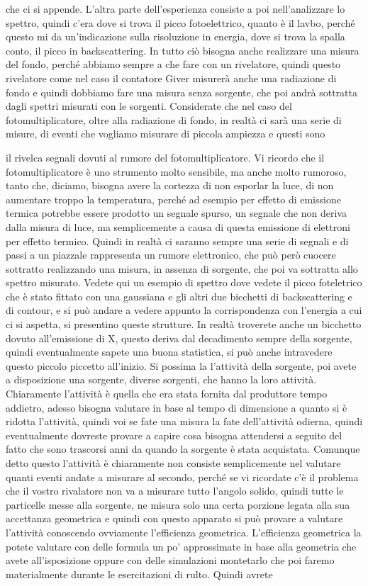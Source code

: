 che ci si appende. L'altra parte dell'esperienza consiste a poi nell'analizzare lo spettro, quindi c'era dove si trova il picco fotoelettrico, quanto è il lavbo, perché questo mi da un'indicazione sulla risoluzione in energia, dove si trova la spalla conto, il picco in backscattering. In tutto ciò bisogna anche realizzare una misura del fondo, perché abbiamo sempre a che fare con un rivelatore, quindi questo rivelatore come nel caso il contatore Giver misurerà anche una radiazione di fondo e quindi dobbiamo fare una misura senza sorgente, che poi andrà sottratta dagli spettri misurati con le sorgenti. Considerate che nel caso del fotomultiplicatore, oltre alla radiazione di fondo, in realtà ci sarà una serie di misure, di eventi che vogliamo misurare di piccola ampiezza e questi sono 

il rivelca segnali dovuti al rumore del fotomultiplicatore. Vi ricordo che il fotomultiplicatore è uno strumento molto sensibile, ma anche molto rumoroso, tanto che, diciamo, bisogna avere la cortezza di non esporlar la luce, di non aumentare troppo la temperatura, perché ad esempio per effetto di emissione termica potrebbe essere prodotto un segnale spurso, un segnale che non deriva dalla misura di luce, ma semplicemente a causa di questa emissione di elettroni per effetto termico. Quindi in realtà ci saranno sempre una serie di segnali e di passi a un piazzale rappresenta un rumore elettronico, che può però cuocere sottratto realizzando una misura, in assenza di sorgente, che poi va sottratta allo spettro misurato. Vedete qui un esempio di spettro dove vedete il picco foteletrico che è stato fittato con una gaussiana e gli altri due bicchetti di backscattering e di contour, e si può andare a vedere appunto la corrispondenza con l'energia a cui ci si aspetta, si presentino queste strutture. In realtà troverete anche un bicchetto dovuto all'emissione di X, questo deriva dal decadimento sempre della sorgente, quindi eventualmente sapete una buona statistica, si può anche intravedere questo piccolo piccetto all'inizio. Si possima la l'attività della sorgente, poi avete a disposizione una sorgente, diverse sorgenti, che hanno la loro attività. Chiaramente l'attività è quella che era stata fornita dal produttore tempo addietro, adesso bisogna valutare in base al tempo di dimensione a quanto si è ridotta l'attività, quindi voi se fate una misura la fate dell'attività odierna, quindi eventualmente dovreste provare a capire cosa bisogna attendersi a seguito del fatto che sono trascorsi anni da quando la sorgente è stata acquistata. Comunque detto questo l'attività è chiaramente non consiste semplicemente nel valutare quanti eventi andate a misurare al secondo, perché se vi ricordate c'è il problema che il vostro rivalatore non va a misurare tutto l'angolo solido, quindi tutte le particelle messe alla sorgente, ne misura solo una certa porzione legata alla sua accettanza geometrica e quindi con questo apparato si può provare a valutare l'attività conoscendo ovviamente l'efficienza geometrica. L'efficienza geometrica la potete valutare con delle formula un po' approssimate in base alla geometria che avete all'isposizione oppure con delle simulazioni montetarlo che poi faremo materialmente durante le esercitazioni di rulto. Quindi avrete 